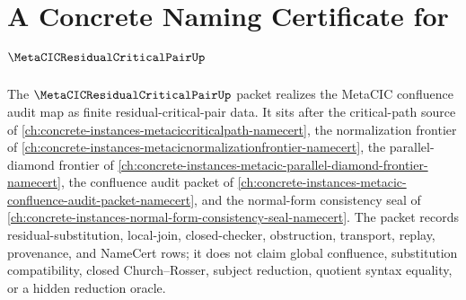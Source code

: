 \chapter{A Concrete Naming Certificate for $\MetaCICResidualCriticalPairUp$}
\label{ch:concrete-instances-metacic-residual-critical-pair-namecert}

The $\MetaCICResidualCriticalPairUp$ packet realizes the MetaCIC confluence audit map as finite residual-critical-pair data. It sits after the critical-path source of \autoref{ch:concrete-instances-metaciccriticalpath-namecert}, the normalization frontier of \autoref{ch:concrete-instances-metacicnormalizationfrontier-namecert}, the parallel-diamond frontier of \autoref{ch:concrete-instances-metacic-parallel-diamond-frontier-namecert}, the confluence audit packet of \autoref{ch:concrete-instances-metacic-confluence-audit-packet-namecert}, and the normal-form consistency seal of \autoref{ch:concrete-instances-normal-form-consistency-seal-namecert}. The packet records residual-substitution, local-join, closed-checker, obstruction, transport, replay, provenance, and NameCert rows; it does not claim global confluence, substitution compatibility, closed Church--Rosser, subject reduction, quotient syntax equality, or a hidden reduction oracle.

